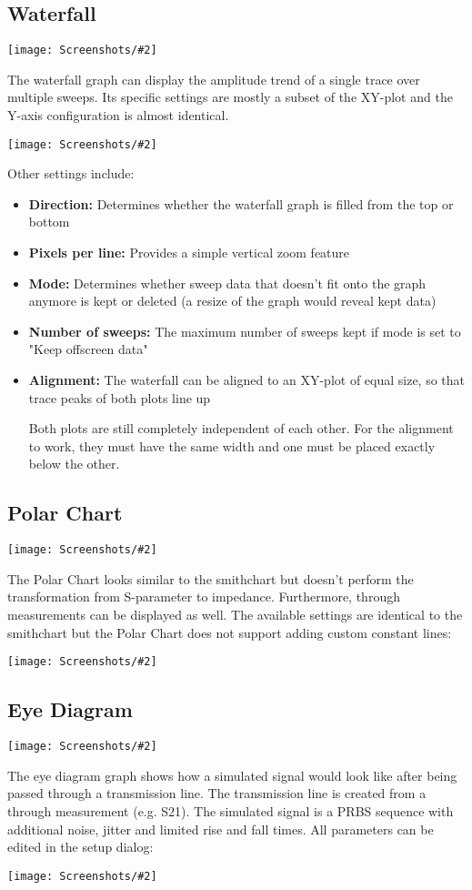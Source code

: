 \documentclass[a4paper,11pt]{article}
\newcommand\danger[1][5ex]{%
  \renewcommand\stacktype{L}%
  \scaleto{\stackon[1.3pt]{\color{red}$\triangle$}{\tiny !}}{#1}%
}
\newenvironment{important}[1][]{%
   \begin{mdframed}[%
      backgroundcolor={red!15}, hidealllines=true,
      skipabove=0.7\baselineskip, skipbelow=0.7\baselineskip,
      splitbottomskip=2pt, splittopskip=4pt, #1]%
   \makebox[0pt]{%
      \smash{%
         \hspace*{-45pt}%
         \raisebox{-5pt}{%
            {\danger}%
         }%
      }%
   }%
}{\end{mdframed}}
\newcommand{\screenshot}[2]{\begin{center}
\texttt{[image: Screenshots/\#2]}
\end{center}}
\begin{document}
\subsection{Waterfall}
\screenshot{1.0}{GraphWaterfall.png}
The waterfall graph can display the amplitude trend of a single trace over multiple sweeps. Its specific settings are mostly a subset of the XY-plot and the Y-axis configuration is almost identical.
\screenshot{0.8}{GraphWaterfallSetup.png}
Other settings include:
\begin{itemize}
\item \textbf{Direction:} Determines whether the waterfall graph is filled from the top or bottom
\item \textbf{Pixels per line:} Provides a simple vertical zoom feature
\item \textbf{Mode:} Determines whether sweep data that doesn't fit onto the graph anymore is kept or deleted (a resize of the graph would reveal kept data)
\item \textbf{Number of sweeps:} The maximum number of sweeps kept if mode is set to "Keep offscreen data"
\item \textbf{Alignment:} The waterfall can be aligned to an XY-plot of equal size, so that trace peaks of both plots line up
\begin{important}
Both plots are still completely independent of each other. For the alignment to work, they must have the same width and one must be placed exactly below the other.
\end{important}
\end{itemize}
\subsection{Polar Chart}
\screenshot{0.6}{GraphPolarplot.png}
The Polar Chart looks similar to the smithchart but doesn't perform the transformation from S-parameter to impedance. Furthermore, through measurements can be displayed as well. The available settings are identical to the smithchart but the Polar Chart does not support adding custom constant lines:
\screenshot{0.6}{GraphPolarchartSetup.png}

\subsection{Eye Diagram}
\screenshot{1.0}{GraphEyeDiagram.png}
The eye diagram graph shows how a simulated signal would look like after being passed through a transmission line. The transmission line is created from a through measurement (e.g. S21). The simulated signal is a PRBS sequence with additional noise, jitter and limited rise and fall times. All parameters can be edited in the setup dialog:
\screenshot{1.0}{GraphEyeDiagramSetup.png}
\end{document}
